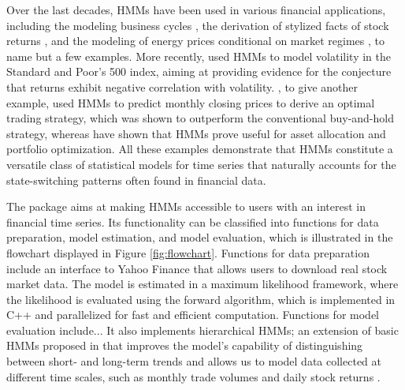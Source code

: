 \documentclass[article]{jss}
\begin{document}
Over the last decades, HMMs have been used in various financial applications, including the modeling business cycles \citep{kim98, gre00}, the derivation of stylized facts of stock returns \citep{bul06, nys15a}, and the modeling of energy prices conditional on market regimes \citep{lan18, ada22}, to name but a few examples.
More recently, \cite{lih17} used HMMs to model volatility in the Standard and Poor's 500 index, aiming at providing evidence for the conjecture that returns exhibit negative correlation with volatility. \cite{ngu18}, to give another example, used HMMs to predict monthly closing prices to derive an optimal trading strategy, which was shown to outperform the conventional buy-and-hold strategy, whereas \cite{bul11, nys15a, nys18} have shown that HMMs prove useful for asset allocation and portfolio optimization. All these examples demonstrate that HMMs constitute a versatile class of statistical models for time series that naturally accounts for the state-switching patterns often found in financial data.

The  package \citep{oel22} aims at making HMMs accessible to users with an interest in financial time series. Its functionality can be classified into functions for data preparation, model estimation, and model evaluation, which is illustrated in the flowchart displayed in Figure \ref{fig:flowchart}. Functions for data preparation include an interface to Yahoo Finance that allows users to download real stock market data. The model is estimated in a maximum likelihood framework, where the likelihood is evaluated using the forward algorithm, which is implemented in C++ and parallelized for fast and efficient computation. Functions for model evaluation include... It also implements hierarchical HMMs; an extension of basic HMMs proposed in \cite{oel21} that improves the model's capability of distinguishing between short- and long-term trends and allows us to model data collected at different time scales, such as monthly trade volumes and daily stock returns \citep{ada20}. 
\end{document}
